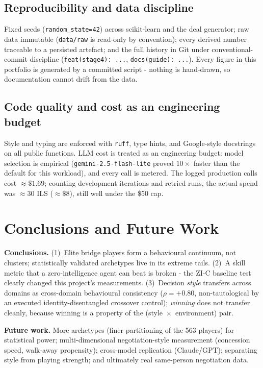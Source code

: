 \documentclass[11pt, a4paper, oneside, openany]{report}
\begin{document}
\section{Reproducibility and data discipline}
Fixed seeds (\texttt{random\_state=42}) across scikit-learn and the deal
generator; raw data immutable (\texttt{data/raw} is read-only by
convention); every derived number traceable to a persisted artefact; and the
full history in Git under conventional-commit discipline
(\texttt{feat(stage4): ...}, \texttt{docs(guide): ...}). Every figure in
this portfolio is generated by a committed script - nothing is hand-drawn,
so documentation cannot drift from the data.

\section{Code quality and cost as an engineering budget}
Style and typing are enforced with \texttt{ruff}, type hints, and
Google-style docstrings on all public functions. LLM cost is treated as an
engineering budget: model selection is empirical
(\texttt{gemini-2.5-flash-lite} proved $10\times$ faster than the default
for this workload), and every call is metered. The logged production calls
cost ${\approx}\$1.69$; counting development iterations and retried runs, the
actual spend was ${\approx}30$ ILS (${\approx}\$8$), still well under the
\$50 cap.

\chapter{Conclusions and Future Work}

\textbf{Conclusions.} (1)~Elite bridge players form a behavioural continuum,
not clusters; statistically validated archetypes live in its extreme tails.
(2)~A skill metric that a zero-intelligence agent can beat is broken - the
ZI-C baseline test clearly changed this project's measurements.
(3)~Decision \emph{style} transfers across domains as cross-domain behavioural
consistency ($\rho = +0.80$, non-tautological by an executed
identity-disentangled crossover control); \emph{winning} does not transfer
cleanly, because winning is a property of the (style~$\times$~environment) pair.

\textbf{Future work.} More archetypes (finer partitioning of the 563 players)
for statistical power; multi-dimensional negotiation-style measurement
(concession speed, walk-away propensity); cross-model replication
(Claude/GPT); separating style from playing strength; and ultimately real
same-person negotiation data.
\end{document}
